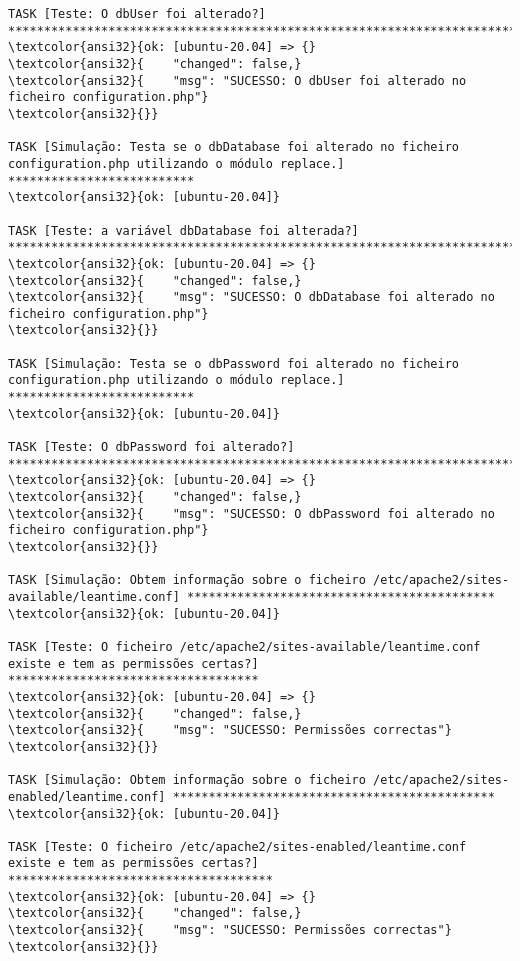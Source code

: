 \documentclass{scrartcl}
\begin{document}
\begin{Verbatim}
TASK [Teste: O dbUser foi alterado?] *****************************************************************************************************
\textcolor{ansi32}{ok: [ubuntu-20.04] => {}
\textcolor{ansi32}{    "changed": false,}
\textcolor{ansi32}{    "msg": "SUCESSO: O dbUser foi alterado no ficheiro configuration.php"}
\textcolor{ansi32}{}}

TASK [Simulação: Testa se o dbDatabase foi alterado no ficheiro configuration.php utilizando o módulo replace.] **************************
\textcolor{ansi32}{ok: [ubuntu-20.04]}

TASK [Teste: a variável dbDatabase foi alterada?] ****************************************************************************************
\textcolor{ansi32}{ok: [ubuntu-20.04] => {}
\textcolor{ansi32}{    "changed": false,}
\textcolor{ansi32}{    "msg": "SUCESSO: O dbDatabase foi alterado no ficheiro configuration.php"}
\textcolor{ansi32}{}}

TASK [Simulação: Testa se o dbPassword foi alterado no ficheiro configuration.php utilizando o módulo replace.] **************************
\textcolor{ansi32}{ok: [ubuntu-20.04]}

TASK [Teste: O dbPassword foi alterado?] *************************************************************************************************
\textcolor{ansi32}{ok: [ubuntu-20.04] => {}
\textcolor{ansi32}{    "changed": false,}
\textcolor{ansi32}{    "msg": "SUCESSO: O dbPassword foi alterado no ficheiro configuration.php"}
\textcolor{ansi32}{}}

TASK [Simulação: Obtem informação sobre o ficheiro /etc/apache2/sites-available/leantime.conf] *******************************************
\textcolor{ansi32}{ok: [ubuntu-20.04]}

TASK [Teste: O ficheiro /etc/apache2/sites-available/leantime.conf existe e tem as permissões certas?] ***********************************
\textcolor{ansi32}{ok: [ubuntu-20.04] => {}
\textcolor{ansi32}{    "changed": false,}
\textcolor{ansi32}{    "msg": "SUCESSO: Permissões correctas"}
\textcolor{ansi32}{}}

TASK [Simulação: Obtem informação sobre o ficheiro /etc/apache2/sites-enabled/leantime.conf] *********************************************
\textcolor{ansi32}{ok: [ubuntu-20.04]}

TASK [Teste: O ficheiro /etc/apache2/sites-enabled/leantime.conf existe e tem as permissões certas?] *************************************
\textcolor{ansi32}{ok: [ubuntu-20.04] => {}
\textcolor{ansi32}{    "changed": false,}
\textcolor{ansi32}{    "msg": "SUCESSO: Permissões correctas"}
\textcolor{ansi32}{}}


\end{Verbatim}
\end{document}
